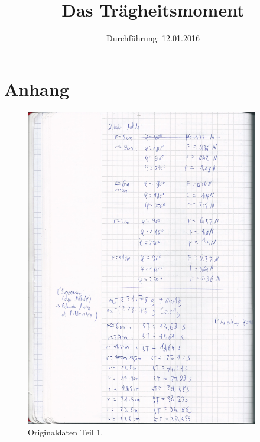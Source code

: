 

\subject{Versuchsprotokoll zum Versuch Nr. 101}
\title{Das Trägheitsmoment}
\date{
  Durchführung: 12.01.2016
}



\maketitle
\newpage






\section{Anhang}
\begin{figure}[H]
  \centering
  \includegraphics[height=14cm]{original1.jpg}
  \caption{Originaldaten Teil 1.}
  \label{fig:original1}
\end{figure}

